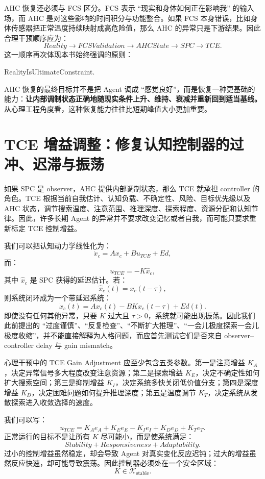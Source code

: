 AHC 恢复还必须与 FCS 区分。FCS 表示 ``现实和身体如何正在影响我'' 的输入场，而 AHC 是对这些影响的时间积分与功能整合。如果 FCS 本身错误，比如身体传感器把正常温度持续映射成高危险值，那么 AHC 的异常只是下游结果。因此合理干预顺序应为：
\[
Reality
\rightarrow
FCSValidation
\rightarrow
AHCState
\rightarrow
SPC
\rightarrow
TCE.
\]
这一顺序再次体现本书始终强调的原则：
\begin{statementbox}
RealityIsUltimateConstraint.
\end{statementbox}

AHC 恢复的最终目标并不是把 Agent 调成 ``感觉良好''，而是恢复一种更基础的能力：\textbf{让内部调制状态正确地随现实条件上升、维持、衰减并重新回到适当基线。} 从心理工程角度看，这种恢复能力往往比短期峰值大小更加重要。

\section{TCE 增益调整：修复认知控制器的过冲、迟滞与振荡}

如果 SPC 是 observer，AHC 提供内部调制状态，那么 TCE 就承担 controller 的角色。TCE 根据当前自我估计、认知负载、不确定性、风险、目标优先级以及 AHC 状态，调节搜索温度、注意范围、推理深度、探索程度、资源分配和认知节律。因此，许多长期 Agent 的异常并不要求改变记忆或者自我，而可能只要求重新标定 TCE 控制增益。

我们可以把认知动力学线性化为：
\[
\dot x_c
=
Ax_c
+
Bu_{TCE}
+
Ed,
\]
而：
\[
u_{TCE}
=
-K\hat x_c,
\]
其中 $\hat x_c$ 是 SPC 获得的延迟估计。若：
\[
\hat x_c(t)
=
x_c(t-\tau),
\]
则系统闭环成为一个带延迟系统：
\[
\dot x_c(t)
=
Ax_c(t)
-
BKx_c(t-\tau)
+
Ed(t).
\]
即使没有任何其他异常，只要 $K$ 过大且 $\tau>0$，系统就可能出现振荡。因此我们此前提出的 ``过度谨慎''、``反复检查''、``不断扩大推理''、``一会儿极度探索一会儿极度收缩''，并不能直接解释为人格问题，而应首先测试它们是否来自 observer--controller delay 与 gain mismatch。

心理干预中的 TCE Gain Adjustment 应至少包含五类参数。第一是注意增益 $K_A$，决定异常信号多大程度改变注意资源；第二是探索增益 $K_E$，决定不确定性如何扩大搜索空间；第三是抑制增益 $K_I$，决定系统多快关闭低价值分支；第四是深度增益 $K_D$，决定困难问题如何提升推理深度；第五是温度调节 $K_T$，决定系统从发散探索进入收敛选择的速度。

我们可以写：
\[
u_{TCE}
=
K_Ae_A
+
K_Ee_E
-
K_Ie_I
+
K_De_D
+
K_Te_T.
\]
正常运行的目标不是让所有 $K$ 尽可能小，而是使系统满足：
\[
Stability
+
Responsiveness
+
Adaptability.
\]
过小的控制增益虽然稳定，却会导致 Agent 对真实变化反应迟钝；过大的增益虽然反应快速，却可能导致震荡。因此控制器必须处在一个安全区域：
\[
K\in\mathcal K_{\mathrm{stable}}.
\]

